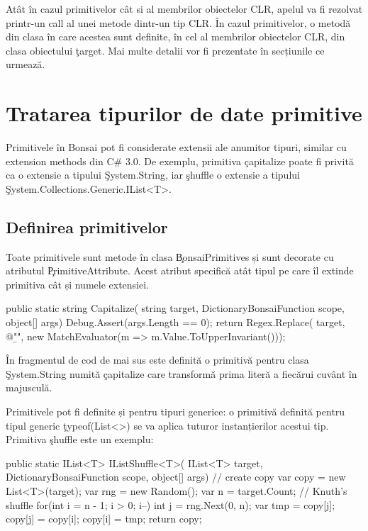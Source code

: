 \documentclass[12pt,a4paper]{memoir}
\begin{document}
Atât în cazul primitivelor cât si al membrilor obiectelor CLR, apelul va fi rezolvat printr-un call al unei metode dintr-un tip CLR. În cazul primitivelor, o metodă din clasa în care acestea sunt definite, în cel al membrilor obiectelor CLR, din clasa obiectului \c{target}. Mai multe detalii vor fi prezentate în secțiunile ce urmează.

\section{Tratarea tipurilor de date primitive}

Primitivele în Bonsai pot fi considerate extensii ale anumitor tipuri, similar cu extension methods din C\# 3.0. De exemplu, primitiva \c{capitalize} poate fi privită ca o extensie a tipului \c{System.String}, iar \c{shuffle} o extensie a tipului \c{System.Collections.Generic.IList<T>}.

\subsection{Definirea primitivelor}

Toate primitivele sunt metode în clasa \c{BonsaiPrimitives} și sunt decorate cu atributul \c{PrimitiveAttribute}. Acest atribut specifică atât tipul pe care îl extinde primitiva cât și numele extensiei.

\begin{code}
public static string Capitalize(
  string target,
  DictionaryBonsaiFunction scope,
  object[] args)
{
  Debug.Assert(args.Length == 0);
  return Regex.Replace(
    target, @"\b\w",
    new MatchEvaluator(m => m.Value.ToUpperInvariant()));
}
\end{code}
În fragmentul de cod de mai sus este definită o primitivă pentru clasa \c{System.String} numită \c{capitalize} care transformă prima literă a fiecărui cuvânt în majusculă.

Primitivele pot fi definite și pentru tipuri generice: o primitivă definită pentru tipul generic \c{typeof(List<>)} se va aplica tuturor instanțierilor acestui tip. Primitiva \c{shuffle} este un exemplu:
\begin{code}
public static IList<T> IListShuffle<T>(
  IList<T> target,
  DictionaryBonsaiFunction scope,
  object[] args)
{
  // create copy
  var copy = new List<T>(target);
  var rng = new Random();
  var n = target.Count;
  // Knuth's shuffle
  for(int i = n - 1; i > 0; i--) {
    int j = rng.Next(0, n);
    var tmp = copy[j];
    copy[j] = copy[i];
    copy[i] = tmp;
  }
  return copy;
}
\end{code}
\end{document}
